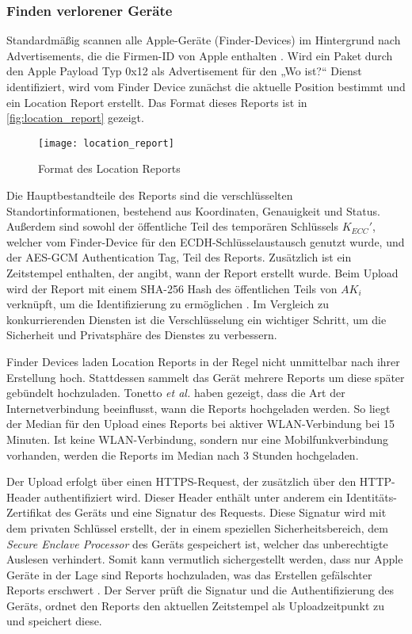 \subsubsection{Finden verlorener Geräte}
Standardmäßig scannen alle Apple-Geräte (Finder-Devices) im Hintergrund nach Advertisements, die die Firmen-ID von Apple enthalten \cite{Heinrich_FindMy,Martin_continuity}.
Wird ein Paket durch den Apple Payload Typ 0x12 als Advertisement für den „Wo ist?“ Dienst identifiziert, wird vom Finder Device zunächst die aktuelle Position bestimmt und ein Location Report erstellt.
Das Format dieses Reports ist in \autoref{fig:location_report} gezeigt.
\begin{figure}[ht]
    \centering
    \texttt{[image: location\_report]}
    \caption{Format des Location Reports \cite{Heinrich_FindMy}}
    \label{fig:location_report}
\end{figure}
Die Hauptbestandteile des Reports sind die verschlüsselten Standortinformationen, bestehend aus Koordinaten, Genauigkeit und Status.
Außerdem sind sowohl der öffentliche Teil des temporären Schlüssels $K_{ECC}'$, welcher vom Finder-Device für den \ac{ECDH}-Schlüsselaustausch genutzt wurde, und der \ac{AES}-\ac{GCM} Authentication Tag, Teil des Reports.
Zusätzlich ist ein Zeitstempel enthalten, der angibt, wann der Report erstellt wurde.
Beim Upload wird der Report mit einem \ac{SHA}-256 Hash des öffentlichen Teils von $AK_i$ verknüpft, um die Identifizierung zu ermöglichen \cite{Heinrich_FindMy}.
Im Vergleich zu konkurrierenden Diensten ist die Verschlüsselung ein wichtiger Schritt, um die Sicherheit und Privatsphäre des Dienstes zu verbessern.

Finder Devices laden Location Reports in der Regel nicht unmittelbar nach ihrer Erstellung hoch.
Stattdessen sammelt das Gerät mehrere Reports um diese später gebündelt hochzuladen.
Tonetto \textit{et al.} \cite{Tonetto_FindMy} haben gezeigt, dass die Art der Internetverbindung beeinflusst, wann die Reports hochgeladen werden.
So liegt der Median für den Upload eines Reports bei aktiver WLAN-Verbindung bei 15 Minuten.
Ist keine WLAN-Verbindung, sondern nur eine Mobilfunkverbindung vorhanden, werden die Reports im Median nach 3 Stunden hochgeladen.

Der Upload erfolgt über einen HTTPS-Request, der zusätzlich über den HTTP-Header authentifiziert wird.
Dieser Header enthält unter anderem ein Identitäts-Zertifikat des Geräts und eine Signatur des Requests.
Diese Signatur wird mit dem privaten Schlüssel erstellt, der in einem speziellen Sicherheitsbereich, dem \textit{Secure Enclave Processor} des Geräts gespeichert ist, welcher das unberechtigte Auslesen verhindert.
Somit kann vermutlich sichergestellt werden, dass nur Apple Geräte in der Lage sind Reports hochzuladen, was das Erstellen gefälschter Reports erschwert \cite{Heinrich_FindMy}.
Der Server prüft die Signatur und die Authentifizierung des Geräts, ordnet den Reports den aktuellen Zeitstempel als Uploadzeitpunkt zu und speichert diese.

